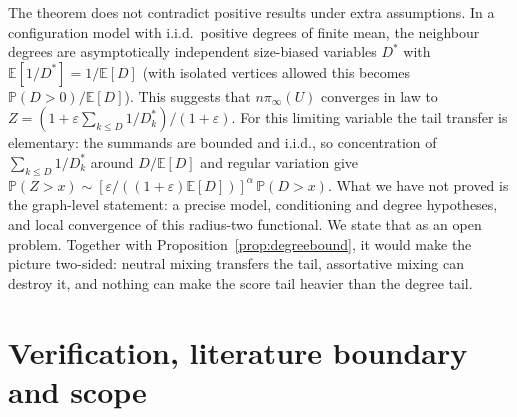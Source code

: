\documentclass[11pt,a4paper]{article}
\theoremstyle{definition}\newtheorem{conjecture}{Conjecture}
\theoremstyle{remark}\newtheorem{remark}[theorem]{Remark}
\newcommand{\eps}{\varepsilon}
\begin{document}
The theorem does not contradict positive results under extra assumptions. In a configuration model with i.i.d.\ positive degrees of finite mean, the neighbour degrees are asymptotically independent size-biased variables $D^*$ with $\mathbb E[1/D^*]=1/\mathbb E[D]$ (with isolated vertices allowed this becomes $\mathbb P(D>0)/\mathbb E[D]$). This suggests that $n\pi_\infty(U)$ converges in law to $Z=(1+\eps\sum_{k\leq D}1/D_k^*)/(1+\eps)$. For this limiting variable the tail transfer is elementary: the summands are bounded and i.i.d., so concentration of $\sum_{k\leq D}1/D_k^*$ around $D/\mathbb E[D]$ and regular variation give $\mathbb P(Z>x)\sim[\eps/((1+\eps)\mathbb E[D])]^\alpha\,\mathbb P(D>x)$. What we have not proved is the graph-level statement: a precise model, conditioning and degree hypotheses, and local convergence of this radius-two functional. We state that as an open problem. Together with Proposition~\ref{prop:degreebound}, it would make the picture two-sided: neutral mixing transfers the tail, assortative mixing can destroy it, and nothing can make the score tail heavier than the degree tail.

\section{Verification, literature boundary and scope}\label{sec:verification}
\end{document}
